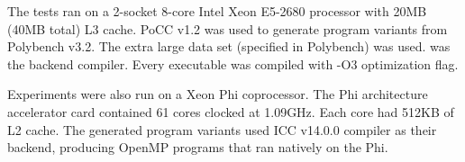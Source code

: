 The tests ran on a 2-socket 8-core Intel Xeon E5-2680 processor with 20MB (40MB total) L3 cache.
PoCC v1.2 was used to generate program variants from Polybench v3.2.
The extra large data set (specified in Polybench) was used. 
 was the backend compiler. Every executable was compiled with
-O3 optimization flag.  

Experiments were also run on a Xeon Phi coprocessor. 
The Phi architecture accelerator card contained 61 cores clocked at 1.09GHz. Each core had 512KB of L2 cache. 
The generated program variants used ICC v14.0.0 compiler as their backend, producing OpenMP programs that ran natively on the Phi.
